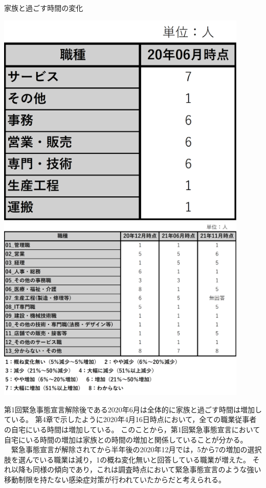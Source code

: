 \documentclass[paper={210mm,297mm},line_length=35zw,number_of_lines=31,head_space=30mm,gutter=40mm,baselineskip=2.0zw,headfoot_verticalposition=1.5zw]{jlreq}
\begin{document}
\begin{table}[H]
  \centering
  \caption{家族と過ごす時間の変化}
  \includegraphics[width=120mm]{../Figure/c05s02_table_調査日ごとの家族と過ごす時間の変化-01.png}
  \includegraphics[width=120mm]{../Figure/c05s02_table_調査日ごとの家族と過ごす時間の変化-02.png}
  \label{家族と過ごす時間}
\end{table}

第1回緊急事態宣言解除後である2020年6月は全体的に家族と過ごす時間は増加している。
第4章で示したように2020年4月16日時点において，全ての職業従事者の自宅にいる時間は増加している。
このことから，第1回緊急事態宣言において自宅にいる時間の増加は家族との時間の増加と関係していることが分かる。\\
　緊急事態宣言が解除されてから半年後の2020年12月では，5から7の増加の選択肢を選んでいる職業は減り，1の概ね変化無いと回答している職業が増えた。
それ以降も同様の傾向であり，これは調査時点において緊急事態宣言のような強い移動制限を持たない感染症対策が行われていたからだと考えられる。\\
\end{document}
